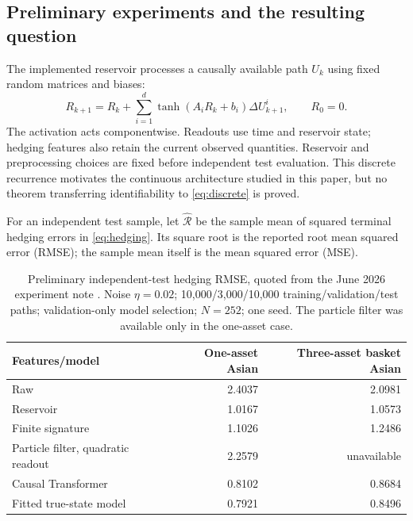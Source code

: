 \documentclass[11pt,a4paper]{article}
\numberwithin{equation}{section}
\theoremstyle{definition}
\theoremstyle{remark}
\begin{document}
\subsection{Preliminary experiments and the resulting question}
The implemented reservoir processes a causally available path $U_k$ using
fixed random matrices and biases:
\begin{equation}\label{eq:discrete}
 R_{k+1}=R_k+\sum_{i=1}^d\tanh(A_iR_k+b_i)\Delta U_{k+1}^i,
 \qquad R_0=0.
\end{equation}
The activation acts componentwise. Readouts use time and reservoir state;
hedging features also retain the current observed quantities. Reservoir and
preprocessing choices are fixed before independent test evaluation. This
discrete recurrence motivates the continuous architecture studied in this paper,
but no theorem transferring identifiability to \eqref{eq:discrete} is proved.

For an independent test sample, let $\widehat{\mathcal R}$ be the sample
mean of squared terminal hedging errors in \eqref{eq:hedging}. Its square
root is the reported root mean squared error (RMSE); the sample mean
itself is the mean squared error (MSE).

\begin{table}[htbp]
\centering
\caption{Preliminary independent-test hedging RMSE, quoted from the June
2026 experiment note \cite{JuneNote}. Noise $\eta=0.02$; 10,000/3,000/10,000
training/validation/test paths; validation-only model selection; $N=252$;
one seed. The particle filter was available only in the one-asset case.}
\label{tab:finance}
\begin{tabular}{@{}lrr@{}}
\toprule
Features/model & One-asset Asian & Three-asset basket Asian \\
\midrule
Raw & 2.4037 & 2.0981 \\
Reservoir & 1.0167 & 1.0573 \\
Finite signature & 1.1026 & 1.2486 \\
Particle filter, quadratic readout & 2.2579 & unavailable \\
Causal Transformer & 0.8102 & 0.8684 \\
Fitted true-state model & 0.7921 & 0.8496 \\
\bottomrule
\end{tabular}
\end{table}
\end{document}

